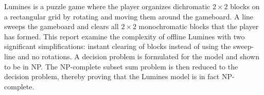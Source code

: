 Lumines is a puzzle game where the player organizes dichromatic $2 \times 2$ blocks on a rectangular grid by rotating and moving them around the gameboard. A line sweeps the gameboard and clears all $2 \times 2$ monochromatic blocks that the player has formed. This report examine the complexity of offline Lumines with two significant simplifications: instant clearing of blocks instead of using the sweep-line and no rotations. A decision problem is formulated for the model and shown to be in NP. The NP-complete subset sum problem is then reduced to the decision problem, thereby proving that the Lumines model is in fact NP-complete.
